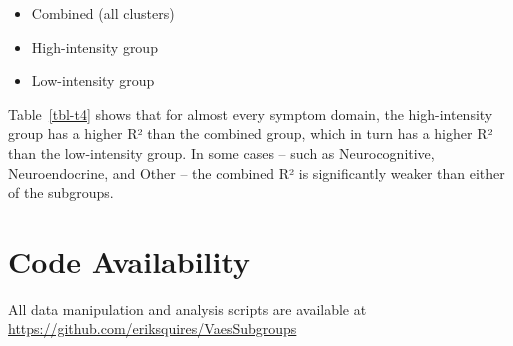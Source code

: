 \documentclass[
  letterpaper,
  DIV=11,
  numbers=noendperiod]{scrartcl}
\providecommand{\tightlist}{%
  \setlength{\itemsep}{0pt}\setlength{\parskip}{0pt}}
\begin{document}
\begin{itemize}
\tightlist
\item
  Combined (all clusters)
\item
  High-intensity group
\item
  Low-intensity group
\end{itemize}

\FloatBarrier

\begin{table}[h]

\caption{\label{tbl-t4}R² by Group}


\end{table}%

Table~\ref{tbl-t4} shows that for almost every symptom domain, the
high-intensity group has a higher R² than the combined group, which in
turn has a higher R² than the low-intensity group. In some cases -- such
as Neurocognitive, Neuroendocrine, and Other -- the combined R² is
significantly weaker than either of the subgroups.

\FloatBarrier
\bigskip

\section*{Code Availability}\label{sec-code}

All data manipulation and analysis scripts are available at
\url{https://github.com/eriksquires/VaesSubgroups}
\end{document}
